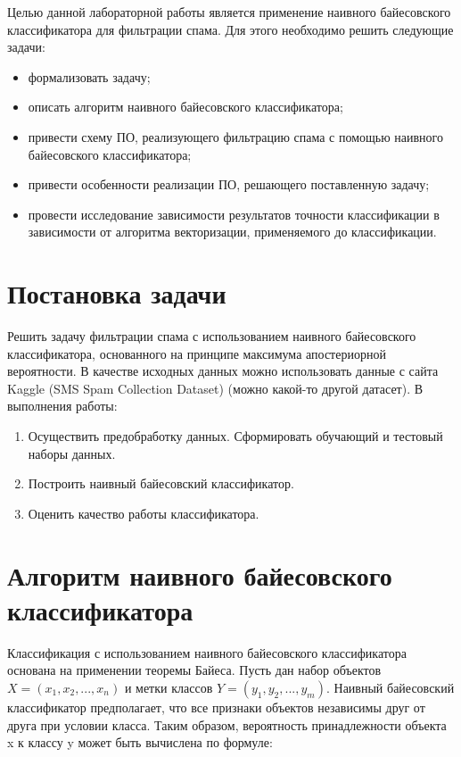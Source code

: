 \documentclass[12pt]{report}
\begin{document}
Целью данной лабораторной работы является применение наивного байесовского классификатора для фильтрации спама.
Для этого необходимо решить следующие задачи:
\begin{itemize}
    \item формализовать задачу;
    \item описать алгоритм наивного байесовского классификатора;
    \item привести схему ПО, реализующего фильтрацию спама с помощью наивного байесовского классификатора;
    \item привести особенности реализации ПО, решающего поставленную задачу;
    \item провести исследование зависимости результатов точности классификации в зависимости от алгоритма векторизации, применяемого до классификации.
\end{itemize}

\section{Постановка задачи}

Решить задачу фильтрации спама с использованием наивного байесовского классификатора, основанного на принципе максимума апостериорной вероятности. В качестве исходных данных можно использовать данные с сайта Kaggle (SMS Spam Collection Dataset) (можно какой-то другой датасет).
В выполнения работы:
\begin{enumerate}
    \item Осуществить предобработку данных. Сформировать обучающий и тестовый наборы данных.
    \item Построить наивный байесовский классификатор.
    \item Оценить качество работы классификатора. 
\end{enumerate}

\section{Алгоритм наивного байесовского классификатора}
Классификация с использованием наивного байесовского классификатора основана на применении теоремы Байеса. Пусть дан набор объектов $X = (x_1, x_2, ..., x_n)$ и метки классов $Y = (y_1, y_2, ..., y_m)$. Наивный байесовский классификатор предполагает, что все признаки объектов независимы друг от друга при условии класса. Таким образом, вероятность принадлежности объекта x к классу y может быть вычислена по формуле:
\end{document}

